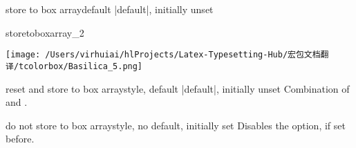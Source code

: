 \begin{docTcbKey}[][doc new=2015-07-13]{store to box array}{}{default |default|, initially unset}
\begin{exdispExample}{storetoboxarray_2}
\begin{tcolorbox}[blanker,width=4cm,
fontupper=\footnotesize,
enforce breakable,%
break at=4cm,
height fixed for=all,
watermark text=\arabic{tcbbreakpart},
reset box array,
store to box array
]
\texttt{[image: /Users/virhuiai/hlProjects/Latex-Typesetting-Hub/宏包文档翻译/tcolorbox/Basilica\_5.png]}\par
\lipsum[1-2]
\end{tcolorbox}

\begin{tcbitemize}[raster columns=3,raster equal height,
size=small,halign=center,sharp corners,colback=blue!5]
\tcbitem{}
\tcbitem{}
\tcbitem{}
\tcbitem{}
\tcbitem{}
\tcbitem{}
\end{tcbitemize}
\end{exdispExample}
\end{docTcbKey}


\begin{docTcbKey}[][doc new=2015-07-13]{reset and store to box array}{}{style, default |default|, initially unset}
Combination of  and .
\end{docTcbKey}



\begin{docTcbKey}[][doc new=2015-07-13]{do not store to box array}{}{style, no default, initially set}
Disables the  option, if set before.
\end{docTcbKey}



